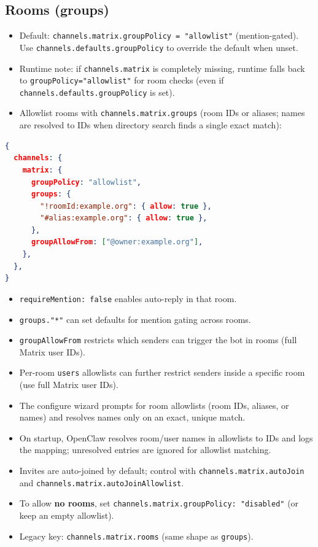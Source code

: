 \subsection{Rooms (groups)}


\begin{itemize}
  \item Default: \texttt{channels.matrix.groupPolicy = "allowlist"} (mention-gated). Use \texttt{channels.defaults.groupPolicy} to override the default when unset.
  \item Runtime note: if \texttt{channels.matrix} is completely missing, runtime falls back to \texttt{groupPolicy="allowlist"} for room checks (even if \texttt{channels.defaults.groupPolicy} is set).
  \item Allowlist rooms with \texttt{channels.matrix.groups} (room IDs or aliases; names are resolved to IDs when directory search finds a single exact match):
\end{itemize}


\begin{lstlisting}[language=json]
{
  channels: {
    matrix: {
      groupPolicy: "allowlist",
      groups: {
        "!roomId:example.org": { allow: true },
        "#alias:example.org": { allow: true },
      },
      groupAllowFrom: ["@owner:example.org"],
    },
  },
}
\end{lstlisting}


\begin{itemize}
  \item \texttt{requireMention: false} enables auto-reply in that room.
  \item \texttt{groups."*"} can set defaults for mention gating across rooms.
  \item \texttt{groupAllowFrom} restricts which senders can trigger the bot in rooms (full Matrix user IDs).
  \item Per-room \texttt{users} allowlists can further restrict senders inside a specific room (use full Matrix user IDs).
  \item The configure wizard prompts for room allowlists (room IDs, aliases, or names) and resolves names only on an exact, unique match.
  \item On startup, OpenClaw resolves room/user names in allowlists to IDs and logs the mapping; unresolved entries are ignored for allowlist matching.
  \item Invites are auto-joined by default; control with \texttt{channels.matrix.autoJoin} and \texttt{channels.matrix.autoJoinAllowlist}.
  \item To allow \textbf{no rooms}, set \texttt{channels.matrix.groupPolicy: "disabled"} (or keep an empty allowlist).
  \item Legacy key: \texttt{channels.matrix.rooms} (same shape as \texttt{groups}).
\end{itemize}


